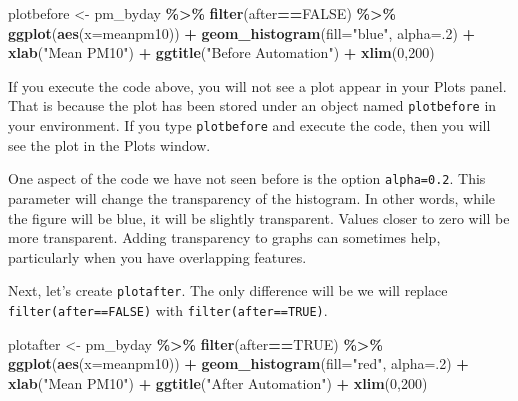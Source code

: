 \documentclass[
]{book}
\newenvironment{Shaded}{\begin{snugshade}}{\end{snugshade}}
\newcommand{\AttributeTok}[1]{\textcolor[rgb]{0.13,0.29,0.53}{#1}}
\newcommand{\ConstantTok}[1]{\textcolor[rgb]{0.56,0.35,0.01}{#1}}
\newcommand{\DecValTok}[1]{\textcolor[rgb]{0.00,0.00,0.81}{#1}}
\newcommand{\FunctionTok}[1]{\textcolor[rgb]{0.13,0.29,0.53}{\textbf{#1}}}
\newcommand{\NormalTok}[1]{#1}
\newcommand{\OtherTok}[1]{\textcolor[rgb]{0.56,0.35,0.01}{#1}}
\newcommand{\SpecialCharTok}[1]{\textcolor[rgb]{0.81,0.36,0.00}{\textbf{#1}}}
\newcommand{\StringTok}[1]{\textcolor[rgb]{0.31,0.60,0.02}{#1}}
\begin{document}
\begin{Shaded}
\begin{Highlighting}[]
\NormalTok{plotbefore }\OtherTok{\textless{}{-}}\NormalTok{ pm\_byday }\SpecialCharTok{\%\textgreater{}\%}
  \FunctionTok{filter}\NormalTok{(after}\SpecialCharTok{==}\ConstantTok{FALSE}\NormalTok{) }\SpecialCharTok{\%\textgreater{}\%}
  \FunctionTok{ggplot}\NormalTok{(}\FunctionTok{aes}\NormalTok{(}\AttributeTok{x=}\NormalTok{meanpm10)) }\SpecialCharTok{+} 
  \FunctionTok{geom\_histogram}\NormalTok{(}\AttributeTok{fill=}\StringTok{"blue"}\NormalTok{, }\AttributeTok{alpha=}\NormalTok{.}\DecValTok{2}\NormalTok{) }\SpecialCharTok{+} 
  \FunctionTok{xlab}\NormalTok{(}\StringTok{"Mean PM10"}\NormalTok{) }\SpecialCharTok{+} 
  \FunctionTok{ggtitle}\NormalTok{(}\StringTok{"Before Automation"}\NormalTok{) }\SpecialCharTok{+} 
  \FunctionTok{xlim}\NormalTok{(}\DecValTok{0}\NormalTok{,}\DecValTok{200}\NormalTok{)}
\end{Highlighting}
\end{Shaded}

If you execute the code above, you will not see a plot appear in your Plots panel. That is because the plot has been stored under an object named \texttt{plotbefore} in your environment. If you type \texttt{plotbefore} and execute the code, then you will see the plot in the Plots window.

One aspect of the code we have not seen before is the option \texttt{alpha=0.2}. This parameter will change the transparency of the histogram. In other words, while the figure will be blue, it will be slightly transparent. Values closer to zero will be more transparent. Adding transparency to graphs can sometimes help, particularly when you have overlapping features.

Next, let's create \texttt{plotafter}. The only difference will be we will replace \texttt{filter(after==FALSE)} with \texttt{filter(after==TRUE)}.

\begin{Shaded}
\begin{Highlighting}[]
\NormalTok{plotafter }\OtherTok{\textless{}{-}}\NormalTok{ pm\_byday }\SpecialCharTok{\%\textgreater{}\%}
  \FunctionTok{filter}\NormalTok{(after}\SpecialCharTok{==}\ConstantTok{TRUE}\NormalTok{) }\SpecialCharTok{\%\textgreater{}\%}
  \FunctionTok{ggplot}\NormalTok{(}\FunctionTok{aes}\NormalTok{(}\AttributeTok{x=}\NormalTok{meanpm10)) }\SpecialCharTok{+} 
  \FunctionTok{geom\_histogram}\NormalTok{(}\AttributeTok{fill=}\StringTok{"red"}\NormalTok{, }\AttributeTok{alpha=}\NormalTok{.}\DecValTok{2}\NormalTok{) }\SpecialCharTok{+} 
  \FunctionTok{xlab}\NormalTok{(}\StringTok{"Mean PM10"}\NormalTok{) }\SpecialCharTok{+} 
  \FunctionTok{ggtitle}\NormalTok{(}\StringTok{"After Automation"}\NormalTok{) }\SpecialCharTok{+} 
  \FunctionTok{xlim}\NormalTok{(}\DecValTok{0}\NormalTok{,}\DecValTok{200}\NormalTok{)}
\end{Highlighting}
\end{Shaded}
\end{document}
